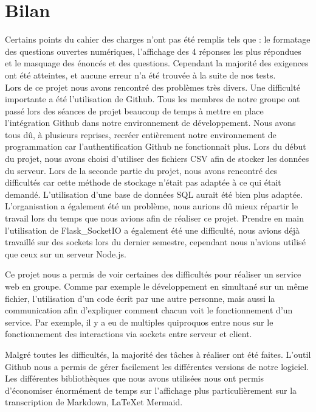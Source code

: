 \documentclass[a4paper, 12pt]{article}
\begin{document}
\newpage
\section{Bilan}

Certains points du cahier des charges n'ont pas été remplis tels que : le formatage des questions ouvertes numériques, l'affichage des 4 réponses les plus répondues et le masquage des énoncés et des questions. Cependant la majorité des exigences ont été atteintes, et aucune erreur n'a été trouvée à la suite de nos tests.\\
Lors de ce projet nous avons rencontré des problèmes très divers. Une difficulté importante a été l'utilisation de Github. Tous les membres de notre groupe ont passé lors des séances de projet beaucoup de temps à mettre en place l'intégration Github dans notre environnement de développement. Nous avons tous dû, à plusieurs reprises, recréer entièrement notre environnement de programmation car l'authentification Github ne fonctionnait plus. 
Lors du début du projet, nous avons choisi d'utiliser des fichiers CSV afin de stocker les données du serveur. Lors de la seconde partie du projet, nous avons rencontré des difficultés car cette méthode de stockage n'était pas adaptée à ce qui était demandé. L'utilisation d'une base de données SQL aurait été bien plus adaptée.
L'organisation a également été un problème, nous aurions dû mieux répartir le travail lors du temps que nous avions afin de réaliser ce projet. 
Prendre en main l'utilisation de Flask\_SocketIO a également été une difficulté, nous avions déjà travaillé sur des sockets lors du dernier semestre, cependant nous n'avions utilisé que ceux sur un serveur Node.js. 


 Ce projet nous a permis de voir certaines des difficultés pour réaliser un service web en groupe. Comme par exemple le développement en simultané sur un même fichier, l'utilisation d'un code écrit par une autre personne, mais aussi la communication afin d'expliquer comment chacun voit le fonctionnement d'un service. Par exemple, il y a eu de multiples quiproquos entre nous sur le fonctionnement des interactions via sockets entre serveur et client.


Malgré toutes les difficultés, la majorité des tâches à réaliser ont été faites. L'outil Github nous a permis de gérer facilement les différentes versions de notre logiciel. Les différentes bibliothèques que nous avons utilisées nous ont permis d'économiser énormément de temps sur l'affichage plus particulièrement sur la transcription de Markdown, \LaTeX  et Mermaid.






    
\end{document}
